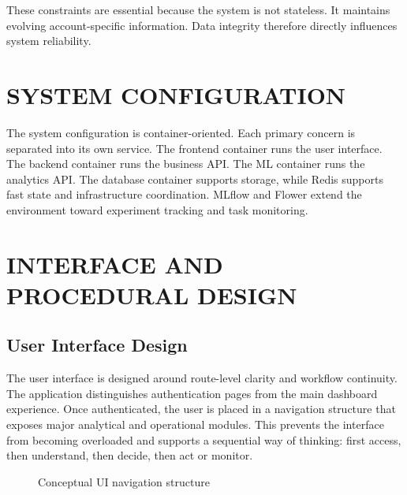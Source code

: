 \documentclass[12pt,a4paper]{report}
\begin{document}
These constraints are essential because the system is not stateless. It maintains evolving account-specific information. Data integrity therefore directly influences system reliability.

\section{SYSTEM CONFIGURATION}
The system configuration is container-oriented. Each primary concern is separated into its own service. The frontend container runs the user interface. The backend container runs the business API. The ML container runs the analytics API. The database container supports storage, while Redis supports fast state and infrastructure coordination. MLflow and Flower extend the environment toward experiment tracking and task monitoring.

\section{INTERFACE AND PROCEDURAL DESIGN}
\subsection{User Interface Design}
The user interface is designed around route-level clarity and workflow continuity. The application distinguishes authentication pages from the main dashboard experience. Once authenticated, the user is placed in a navigation structure that exposes major analytical and operational modules. This prevents the interface from becoming overloaded and supports a sequential way of thinking: first access, then understand, then decide, then act or monitor.

\begin{figure}[H]
\centering
{}
\caption{Conceptual UI navigation structure}
\end{figure}
\end{document}
